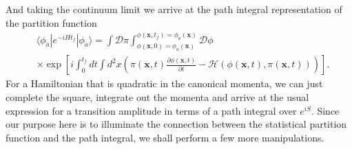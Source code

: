        And taking the continuum limit we arrive at the path integral representation of the partition function
        \begin{align}
            &\langle \phi_a | e^{-i H t_f} | \phi_a \rangle = \int \mathcal{D} \pi \int_{\phi(\bm{x},0) =\phi_a(\bm{x})}^{\phi(\bm{x}, t_f) = \phi_a(\bm{x})} \mathcal{D} \phi \nonumber \\
            &\times \exp \left[i \int_0^{t_f} dt \int d^2 x \left( \pi(\bm{x} ,t) \frac{\partial\phi(\bm{x}, t)}{ \partial t} - \mathcal{H}\left(\phi(\bm{x},t), \pi(\bm{x},t)\right) \right) \right] \label{eq:path_integral_amplitude}.
        \end{align}
        For a Hamiltonian that is quadratic in the canonical momenta, we can just complete the square, integrate out the momenta and arrive at the usual expression for a transition amplitude in terms of a path integral over $e^{i S}$. Since our purpose here is to illuminate the connection between the statistical partition function and the path integral, we shall perform a few more manipulations. 
